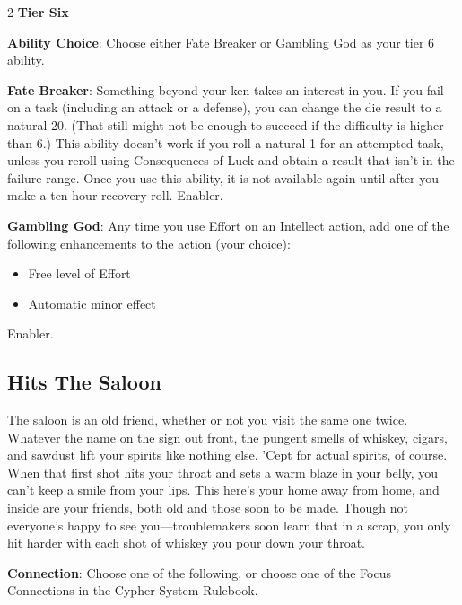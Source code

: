 \begin{multicols}{2}
\textbf{Tier Six}

\textbf{Ability Choice}: Choose either Fate Breaker or Gambling God as your tier 6 ability. 

\textbf{Fate Breaker}: Something beyond your ken takes an interest in you. If you fail on a task (including an attack or a defense), you can change the die result to a natural 20. (That still might not be enough to succeed if the difficulty is higher than 6.) This ability doesn’t work if you roll a natural 1 for an attempted task, unless you reroll using Consequences of Luck and obtain a result that isn’t in the failure range. Once you use this ability, it is not available again until after you make a ten-hour recovery roll. Enabler. 

\textbf{Gambling God}: Any time you use Effort on an Intellect action, add one of the following enhancements to the action (your choice): 
\begin{itemize}
\item Free level of Effort 
\item Automatic minor effect
\end{itemize} 
Enabler.

\subsection{Hits The Saloon}
 
The saloon is an old friend, whether or not you visit the same one twice. Whatever the name on the sign out front, the pungent smells of whiskey, cigars, and sawdust lift your spirits like nothing else. ’Cept for actual spirits, of course. When that first shot hits your throat and sets a warm blaze in your belly, you can’t keep a smile from your lips. This here’s your home away from home, and inside are your friends, both old and those soon to be made. Though not everyone’s happy to see you—troublemakers soon learn that in a scrap, you only hit harder with each shot of whiskey you pour down your throat.

\textbf{Connection}: Choose one of the following, or choose one of the Focus Connections in the Cypher System Rulebook. 


\end{multicols}
